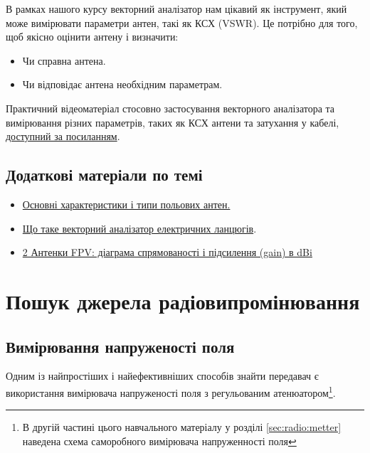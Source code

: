 \documentclass{article}
\begin{document}
В рамках нашого курсу векторний аналізатор нам цікавий як інструмент, який може вимірювати параметри антен, такі як КСХ (VSWR). Це потрібно для того, щоб якісно оцінити антену і визначити:

\begin{itemize}[noitemsep, topsep=8pt]
\item Чи справна антена.
\item Чи відповідає антена необхідним параметрам.
\end{itemize}

Практичний відеоматеріал стосовно застосування векторного аналізатора та вимірювання різних параметрів, таких як КСХ антени та затухання у кабелі, \href{https://www.youtube.com/watch?v=S4V4TL_5KQg}{доступний за посиланням}.

\subsection{Додаткові матеріали по темі}
\begin{itemize}[noitemsep, topsep=8pt]
\item \href{https://sprotyvg7.com.ua/wp-content/uploads/2023/05/Osnovni-harakterystyky-anten_ukr.pdf}{Основні характеристики і типи польових антен.}
\item \href{https://www.tehencom.com/Categories/Network_Analyzers/Basics/Network_Analyzers_Basics-u.htm}{Що таке векторний аналізатор електричних ланцюгів}.
\item \href{https://www.youtube.com/watch?v=1me_Tz3CFmk}{2 Антенки FPV: діаграма спрямованості і підсилення (gain) в dBi}
\end{itemize}

\section{Пошук джерела радіовипромінювання}
 
\subsection{Вимірювання напруженості поля}
 
Одним із найпростіших і найефективніших способів знайти передавач є використання вимірювача напруженості поля з регульованим атенюатором\footnote{В другій частині цього навчального матеріалу у розділі \ref{sec:radio:metter}  наведена схема саморобного вимірювача напруженності поля}. 
 
\end{document}
